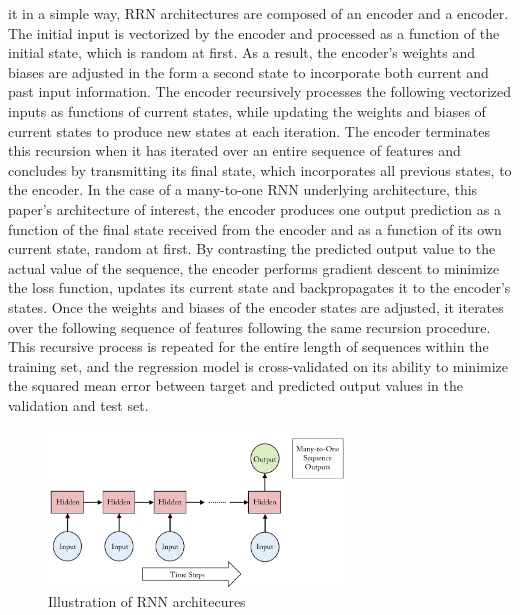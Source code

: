\documentclass{article}
\begin{document}
it in a simple way, RRN architectures are composed of an encoder and a encoder. The initial input is vectorized by the encoder and processed as a function of the initial state, which is random at first. As a result, the encoder's weights and biases are adjusted in the form a second state to incorporate both current and past input information. The encoder recursively processes the following vectorized inputs as functions of current states, while updating the weights and biases of current states to produce new states at each iteration. The encoder terminates this recursion when it has iterated over an entire sequence of features and concludes by transmitting its final state, which incorporates all previous states, to the encoder. In the case of a many-to-one RNN underlying architecture, this paper's architecture of interest, the encoder produces one output prediction as a function of the final state received from the encoder and as a function of its own current state, random at first. By contrasting the predicted output value to the actual value of the sequence, the encoder performs gradient descent to minimize the loss function, updates its current state and backpropagates it to the encoder's states. Once the weights and biases of the encoder states are adjusted, it iterates over the following sequence of features following the same recursion procedure. This recursive process is repeated for the entire length of sequences within the training set, and the regression model is cross-validated on its ability to minimize the squared mean error between target and predicted output values in the validation and test set. 
\begin{figure}
    \caption{Illustration of RNN architecures}
    \includegraphics[width=0.7\textwidth]{images/2023-03-17-16-42-13.png}
\end{figure}
\end{document}
